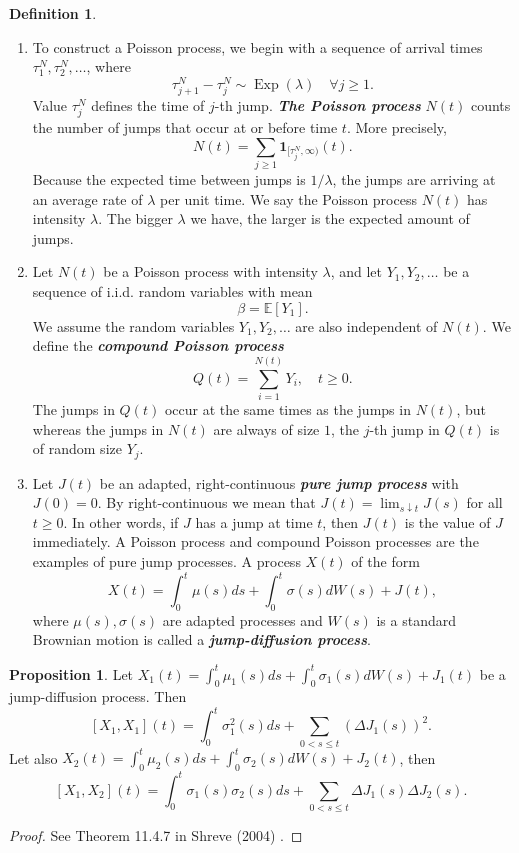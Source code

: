 \documentclass[a4paper,11pt]{book}
\theoremstyle{plain}
\theoremstyle{definition}
\newtheorem{defn}[thm]{Definition}
\newtheorem{prps}[thm]{Proposition}
\newcommand{\ME}{\mathbb{E}}
\newcommand{\define}[1]{\textit{\textbf{#1}}}
\begin{document}
    \begin{defn} \
    	\begin{enumerate}
    		\item To construct a Poisson process, we begin with a sequence of arrival times $\tau_1^N, \tau_2^N, \dots$, where
    		\[ \tau_{j+1}^N - \tau_j^N \sim \operatorname{Exp}(\lambda) \quad \forall j \geq 1.  \]
    		Value $\tau_j^N$ defines the time of $j$-th jump. \define{The Poisson process} $N(t)$ counts the number of jumps that occur at or before time $t$. More precisely,
    		\[ N(t) = \sum_{j \geq 1} \mathbf{1}_{[\tau_j^N, \infty)} (t). \]
    		Because the expected time between jumps is $1/\lambda$, the jumps are arriving at an average rate of $\lambda$ per unit time. We say the Poisson process $N(t)$ has intensity $\lambda$. The bigger $\lambda$ we have, the larger is the expected amount of jumps.
    		\item Let $N(t)$ be a Poisson process with intensity $\lambda$, and let $Y_1, Y_2, \dots$ be a sequence of i.i.d. random variables with mean
    		\[ \beta = \ME[Y_1]. \]
    		We assume the random variables $Y_1, Y_2, \dots$ are also independent of $N(t)$. We define the \define{compound Poisson process}
    		\[ Q(t) = \sum_{i=1}^{N(t)} Y_i, \quad t \geq 0. \]
    		The jumps in $Q(t)$ occur at the same times as the jumps in $N(t)$, but whereas the jumps in $N(t)$ are always of size $1$, the $j$-th jump in $Q(t)$ is of random size $Y_j$.
    		\item
    		Let $J(t)$ be an adapted, right-continuous \define{pure jump process} with $J(0) = 0$. By right-continuous we mean that $J(t) = \lim_{s \downarrow t}J(s)$ for all $t \geq 0$. In other words, if $J$ has a jump at time $t$, then $J(t)$ is the value of $J$ immediately.  A Poisson process and compound Poisson processes are the examples of pure jump processes. A process $X(t)$ of the form
    		\[ X(t) = \int_{0}^t \mu(s)ds + \int_{0}^{t} \sigma(s) dW(s) + J(t), \]
    		where $\mu(s), \sigma(s)$ are adapted processes and $W(s)$ is a standard Brownian motion is called a \define{jump-diffusion process}.
    	\end{enumerate}
    \end{defn}
    
    \begin{prps}
    	Let $X_1(t) = \int_{0}^t \mu_1(s)ds + \int_{0}^{t} \sigma_1(s) dW(s) + J_1(t)$ be a jump-diffusion process. Then
    	\[ [X_1, X_1](t) = \int_0^t \sigma_1^2(s)ds + \sum_{0 < s \leq t} (\Delta J_1(s) )^2. \]
    	Let also $X_2(t) = \int_{0}^t \mu_2(s)ds + \int_{0}^{t} \sigma_2(s) dW(s) + J_2(t)$, then
    	\[ [X_1, X_2](t) = \int_0^t \sigma_1(s) \sigma_2(s) ds + \sum_{0 < s \leq t} \Delta J_1(s)\Delta J_2(s). \]
    \end{prps}
    \begin{proof}
    	See Theorem 11.4.7 in Shreve (2004) \cite{Shreve}.
    \end{proof}
    
\end{document}
